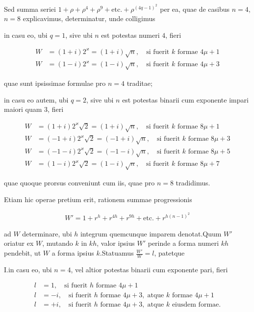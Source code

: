 Sed summa seriei $1+\rho+\rho^4+\rho^9+\text{etc.}+\rho^{(4q-1)^2}$ per ea, quae de casibus $n=4$, $n=8$ explicavimus, determinatur, unde colligimus

in casu eo, ubi $q=1$, sive ubi $n$ est potestas numeri $4$, fieri

\[
\begin{aligned}
W&=(1+i)2^\varkappa=(1+i)\surd n,\quad\text{si fuerit }k\text{ formae }4\mu+1\\
W&=(1-i)2^\varkappa=(1-i)\surd n,\quad\text{si fuerit }k\text{ formae }4\mu+3
\end{aligned}
\]

quae sunt ipsissimae formulae pro $n=4$ traditae;

in casu eo autem, ubi $q=2$, sive ubi $n$ est potestas binarii cum exponente impari maiori quam $3$, fieri

\[
\begin{aligned}
W&=(1+i)2^\varkappa\surd2=(1+i)\surd n,\quad\text{si fuerit }k\text{ formae }8\mu+1\\
W&=(-1+i)2^\varkappa\surd2=(-1+i)\surd n,\quad\text{si fuerit }k\text{ formae }8\mu+3\\
W&=(-1-i)2^\varkappa\surd2=(-1-i)\surd n,\quad\text{si fuerit }k\text{ formae }8\mu+5\\
W&=(1-i)2^\varkappa\surd2=(1-i)\surd n,\quad\text{si fuerit }k\text{ formae }8\mu+7
\end{aligned}
\]

quae quoque prorsus conveniunt cum iis, quae pro $n=8$ tradidimus.


Etiam hic operae pretium erit, rationem summae progressionis

\[
\begin{aligned}
W'=1+r^h+r^{4h}+r^{9h}+\text{etc.}+r^{h(n-1)^2}
\end{aligned}
\]

ad $W$ determinare, ubi $h$ integrum quemcunque imparem denotat.\quad Quum $W'$ oriatur ex $W$, mutando $k$ in $kh$, valor ipsius $W'$ perinde a forma numeri $kh$ pendebit, ut $W$ a forma ipsius $k$.\quad Statuamus $\frac{W'}{W}=l$, patetque

I.\quad in casu eo, ubi $n=4$, vel altior potestas binarii cum exponente pari, fieri

\[
\begin{aligned}
l&=1,\quad\text{si fuerit }h\text{ formae }4\mu+1\\
l&=-i,\quad\text{si fuerit }h\text{ formae }4\mu+3,\;\text{atque }k\text{ formae }4\mu+1\\
l&=+i,\quad\text{si fuerit }h\text{ formae }4\mu+3,\;\text{atque }k\text{ eiusdem formae.}
\end{aligned}
\]

